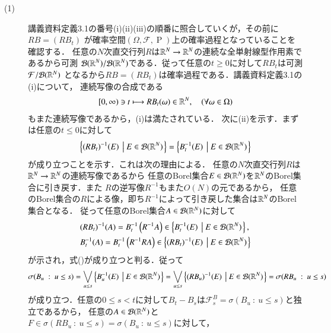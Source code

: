 \begin{prf}
\begin{description}\mbox{}
	\item[(1)] 
		講義資料定義3.1の番号(i)(ii)(iii)の順番に照合していくが，その前に$RB = (RB_t)$
		が確率空間$(\Omega, \mathcal{F}, \operatorname{P})$上の確率過程となっていることを確認する．
		任意の$N$次直交行列$R$は$\mathbb{R}^N \rightarrow \mathbb{R}^N$の連続な全単射線型作用素であるから可測
		$\mathcal{B}(\mathbb{R}^N)/\mathcal{B}(\mathbb{R}^N)$である．従って任意の$t \geq 0$に対して$RB_t$は可測$\mathcal{F}/\mathcal{B}(\mathbb{R}^N)$
		となるから$RB = (RB_t)$は確率過程である．講義資料定義3.1の(i)について，
		連続写像の合成である
		\begin{align}
			[0,\infty) \ni t \longmapsto RB_t(\omega) \in \mathbb{R}^N, \quad(\forall \omega \in \Omega)
		\end{align}
		もまた連続写像であるから，(i)は満たされている．
		次に(ii)を示す．まずは任意の$t \leq 0$に対して
		\begin{align}
			\left\{(RB_t)^{-1}(E)\ \left|\ E \in \mathcal{B}(\mathbb{R}^N) \right.\right\} 
			= \left\{B_t^{-1}(E)\ \left|\ E \in \mathcal{B}(\mathbb{R}^N) \right.\right\} \label{eq:stoc_proc_Q1_1}
		\end{align}
		が成り立つことを示す．これは次の理由による．
		任意の$N$次直交行列$R$は$\mathbb{R}^N \rightarrow \mathbb{R}^N$の連続写像であるから
		任意のBorel集合$E \in \mathcal{B}(\mathbb{R}^N)$を$\mathbb{R}^N$のBorel集合に引き戻す．また
		$R$の逆写像$R^{-1}$もまた$O(N)$の元であるから，
		任意のBorel集合の$R$による像，即ち$R^{-1}$によって引き戻した集合は$\mathbb{R}^N$のBorel集合となる．
		従って任意のBorel集合$A \in \mathcal{B}(\mathbb{R}^N)$に対して
		\begin{align}
			&(RB_t)^{-1}(A) = B_t^{-1}\left(R^{-1}A\right) \in \left\{B_t^{-1}(E)\ \left|\ E \in \mathcal{B}(\mathbb{R}^N) \right.\right\}, \\
			&B_t^{-1}(A) = B_t^{-1}\left(R^{-1}RA\right) \in \left\{(RB_t)^{-1}(E)\ \left|\ E \in \mathcal{B}(\mathbb{R}^N) \right.\right\}
		\end{align}
		が示され，式()が成り立つと判る．従って
		\begin{align}
			\sigma(B_u\ :\ u \leq s) = \bigvee_{u \leq s} \left\{B_u^{-1}(E)\ \left|\ E \in \mathcal{B}(\mathbb{R}^N) \right.\right\}
			= \bigvee_{u \leq s} \left\{(RB_u)^{-1}(E)\ \left|\ E \in \mathcal{B}(\mathbb{R}^N) \right.\right\} 
			= \sigma(RB_u\ :\ u \leq s)
		\end{align}
		が成り立つ．任意の$0 \leq s < t$に対して$B_t - B_s$は$\mathcal{F}_s^B = \sigma(B_u\ :\ u \leq s)$と独立であるから，
		任意の$A \in \mathcal{B}(\mathbb{R}^N)$と$F \in \sigma(RB_u\ :\ u \leq s) = \sigma(B_u\ :\ u \leq s)$に対して，

\end{description}
\end{prf}
